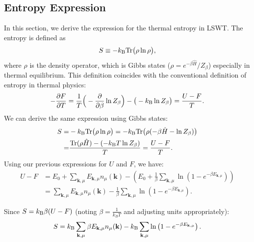 \documentclass[aps, prx, nofootinbib, superscriptaddress]{revtex4-2}
\newcommand{\kvec}{\mathbf{k}}
\newcommand{\Tr}{\mathrm{Tr}}
\begin{document}
\subsection{Entropy Expression}\label{subsec: Entropy}
In this section, we derive the expression for the thermal entropy in LSWT. 
The entropy is defined as 
\begin{equation}
    S \equiv -k_{\rm B}\Tr \big( \rho \ln \rho \big),
\end{equation}
where $\rho$ is the density operator, which is Gibbs states ($\rho = e^{-\beta \hat{H}}/Z_{\beta}$) especially in thermal equilibrium.
This definition coincides with the conventional definition of entropy in thermal physics:
\begin{align}
    - \frac{\partial F}{\partial T}
    = \frac{1}{T} \Big(-\frac{\partial}{\partial \beta} \ln Z_{\beta} \Big) - \big(-k_{\rm B} \ln Z_{\beta} \big)
    = \frac{U - F}{T}.
\end{align}
We can derive the same expression using Gibbs states:
\begin{align}
    S = & -k_{\rm B}\Tr \big( \rho \ln \rho \big)
    = -k_{\rm B}\Tr \big( \rho (-\beta \hat{H} - \ln Z_{\beta}) \big) \nonumber \\
    = &  \frac{ \Tr (\rho \hat{H}) - (-k_{\rm B}T\ln Z_{\beta})}{T} 
    = \frac{U - F}{T}.
\end{align}
Using our previous expressions for $U$ and $F$, we have:
\begin{align}
    U - F &= E_0 + \sum_{\kvec, \mu} E_{\kvec, \mu} n_{\mu}(\kvec) - \left( E_0 + \frac{1}{\beta} \sum_{\kvec, \mu} \ln \left( 1 - e^{-\beta E_{\kvec, \mu}} \right) \right) \nonumber \\ 
    &= \sum_{\kvec, \mu} E_{\kvec, \mu} n_{\mu}(\kvec) - \frac{1}{\beta} \sum_{\kvec, \mu} \ln \left( 1 - e^{-\beta E_{\kvec, \mu}} \right).
\end{align}

Since $S = k_{\rm B} \beta (U - F)$ (noting $\beta = \frac{1}{k_B T}$ and adjusting units appropriately):
\begin{equation}
    S = k_{\rm B} \sum_{\kvec, \mu} \beta E_{\kvec, \mu} n_{\mu} (\kvec) - k_{\rm B} \sum_{\kvec, \mu} \ln \left( 1 - e^{-\beta E_{\kvec, \mu}} \right).
\end{equation}
\end{document}
